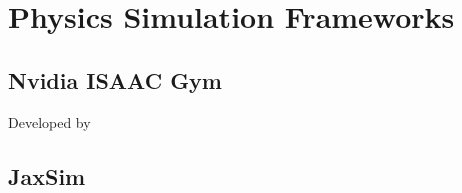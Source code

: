 \chapter{Physics Simulation Frameworks}
\label{chp:03-PhysicsSimulators}
\section{Nvidia ISAAC Gym}

Developed by \cite{makoviychuk_isaac_2021}

\section{JaxSim}

\cite{}